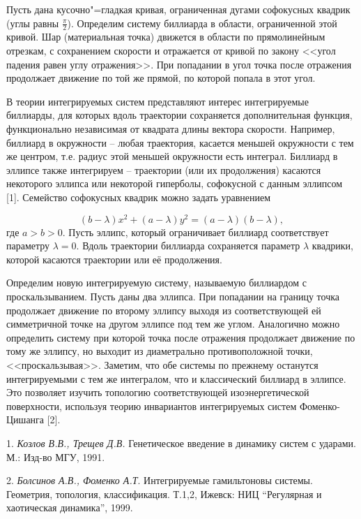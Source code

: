 
\vzmscaption

Пусть дана кусочно"=гладкая кривая, ограниченная дугами софокусных квадрик (углы равны $\frac{\pi}{2}$). Определим систему биллиарда в области, ограниченной этой кривой. Шар (материальная точка) движется в области по прямолинейным отрезкам, с сохранением скорости и отражается от кривой по закону <<угол падения равен углу отражения>>. При попадании в угол точка после отражения продолжает движение по той же прямой, по которой попала в этот угол.

В теории интегрируемых систем представляют интерес интегрируемые биллиарды, для которых вдоль траектории сохраняется дополнительная функция, функционально независимая от квадрата длины вектора скорости. Например, биллиард в окружности – любая траектория, касается меньшей окружности с тем же центром, т.е. радиус этой меньшей окружности есть интеграл. Биллиард в эллипсе также интегрируем – траектории (или их продолжения) касаются некоторого эллипса или некоторой гиперболы, софокусной с данным эллипсом [1].
Семейство софокусных квадрик можно задать уравнением

$$(b-\lambda)x^2+(a-\lambda)y^2=(a-\lambda)(b-\lambda),$$
где $a>b>0.$ Пусть эллипс, который ограничивает биллиард соответствует параметру $\lambda=0.$ Вдоль траектории биллиарда сохраняется параметр $\lambda$ квадрики, которой касаются траектории или её продолжения.

Определим новую интегрируемую систему, называемую биллиардом с проскальзыванием. Пусть даны два эллипса. При попадании на границу точка продолжает движение по второму эллипсу выходя из соответствующей ей симметричной точке на другом эллипсе под тем же углом. Аналогично можно определить систему при которой точка после отражения продолжает движение по тому же эллипсу, но выходит из диаметрально противоположной точки, <<проскальзывая>>. Заметим, что обе системы по прежнему останутся интегрируемыми с тем же интегралом, что и классический биллиард в эллипсе. Это позволяет изучить топологию соответствующей изоэнергетической поверхности, используя теорию инвариантов интегрируемых систем Фоменко-Цишанга [2].



\litlist

1. {\it Козлов В.В., Трещев Д.В.} Генетическое введение в динамику систем с ударами. М.: Изд-во МГУ, 1991.

2. {\it Болсинов А.В., Фоменко А.Т}. Интегрируемые гамильтоновы системы. Геометрия, топология, классификация. Т.1,2, Ижевск: НИЦ “Регулярная и хаотическая динамика”, 1999.
